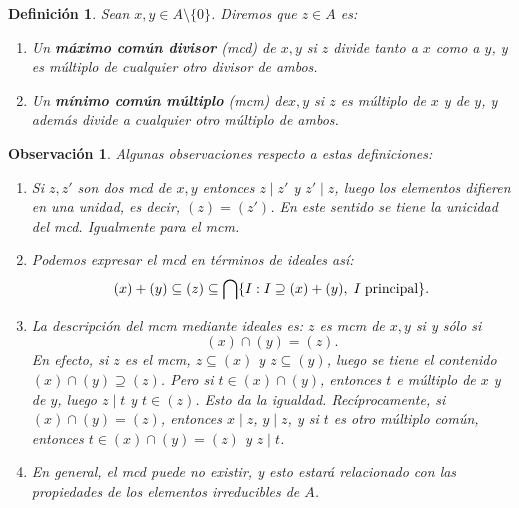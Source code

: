 \documentclass[12pt]{article}
\newtheorem{definition}[theorem]{Definición}
\newtheorem{observation}{Observación}[theorem]
\begin{document}
\begin{definition} Sean $x,y \in A\setminus \lbrace 0 \rbrace$. Diremos que $z \in A$ es: \begin{enumerate}
\item Un \textbf{máximo común divisor} (mcd) de $x,y$ si $z$ divide tanto a $x$ como a $y$, y es múltiplo de cualquier otro divisor de ambos.
\item Un \textbf{mínimo común múltiplo} (mcm) de$x,y$ si $z$ es múltiplo de $x$ y de $y$, y además divide a cualquier otro múltiplo de ambos.
\end{enumerate}
\end{definition}

\begin{observation}\label{eq:obs} Algunas observaciones respecto a estas definiciones: \begin{enumerate}
\item Si $z, z'$ son dos mcd de $x,y$ entonces $z \mid z'$ y $z' \mid z$, luego los elementos difieren en una unidad, es decir, $(z) = (z')$. En este sentido se tiene la unicidad del mcd. Igualmente para el mcm.
\item Podemos expresar el mcd en términos de ideales así: $$(x) + (y) \subseteq (z) \subseteq \bigcap \lbrace I : I\supseteq (x) +(y), \hspace{0.1cm} I \hspace{0.1cm} \text{principal}\rbrace.$$
\item La descripción del mcm mediante ideales es: $z$ es mcm de $x,y$ si y sólo si $$(x) \cap (y) = (z).$$ En efecto, si $z$ es el mcm, $z \subseteq (x)$ y $z \subseteq (y)$, luego se tiene el contenido $(x) \cap (y) \supseteq (z)$. Pero si $t \in (x) \cap (y)$, entonces $t$ e múltiplo de $x$ y de $y$, luego $z \mid t$ y $t \in (z)$. Esto da la igualdad. Recíprocamente, si $(x) \cap (y) = (z)$, entonces $x \mid z$, $y \mid z$, y si $t$ es otro múltiplo común, entonces $t \in (x) \cap (y) = (z)$ y $z \mid t$.
\item En general, el mcd puede no existir, y esto estará relacionado con las propiedades de los elementos irreducibles de $A$.
\end{enumerate} 
\end{observation}
\end{document}
